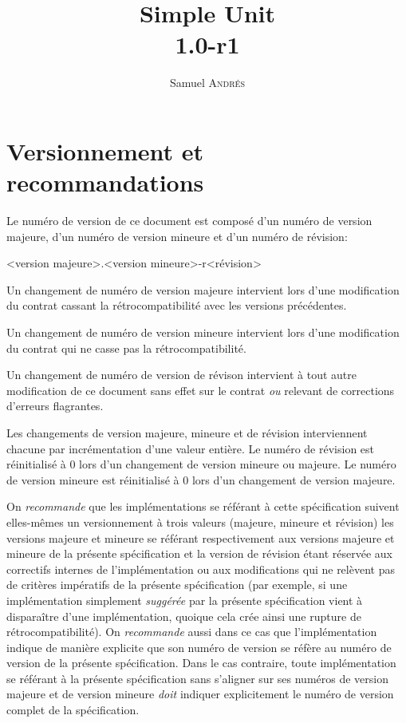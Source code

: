 \documentclass[a4paper,twoside,10pt]{article}
\title{Simple Unit\\1.0-r1}
\author{Samuel \textsc{Andrés}}
\begin{document}
\maketitle

\section{Versionnement et recommandations}

Le numéro de version de ce document est composé d'un numéro de version majeure, d'un numéro de version mineure et d'un
numéro de révision:

<version majeure>.<version mineure>-r<révision>

Un changement de numéro de version majeure intervient lors d'une modification du contrat cassant la rétrocompatibilité
avec les versions précédentes.

Un changement de numéro de version mineure intervient lors d'une modification du contrat qui ne casse pas la
rétrocompatibilité.

Un changement de numéro de version de révison intervient à tout autre modification de ce document sans effet sur le
contrat \emph{ou} relevant de corrections d'erreurs flagrantes.

Les changements de version majeure, mineure et de révision interviennent chacune par incrémentation d'une valeur
entière. Le numéro de révision est réinitialisé à 0 lors d'un changement de version mineure ou majeure. Le numéro de
version mineure est réinitialisé à 0 lors d'un changement de version majeure.

On \emph{recommande} que les implémentations se référant à cette spécification suivent elles-mêmes un versionnement à
trois valeurs (majeure, mineure et révision) les versions majeure et mineure se référant respectivement aux versions
majeure et mineure de la présente spécification et la version de révision étant réservée aux correctifs internes de
l'implémentation ou aux modifications qui ne relèvent pas de critères impératifs de la présente spécification (par
exemple, si une implémentation simplement \emph{suggérée} par la présente spécification vient à disparaître d'une
implémentation, quoique cela crée ainsi une rupture de rétrocompatibilité). On \emph{recommande} aussi dans ce cas que
l'implémentation indique de manière explicite que son numéro de version se réfère au numéro de version de la présente
spécification. Dans le cas contraire, toute implémentation se référant à la présente spécification sans s'aligner sur
ses numéros de version majeure et de version mineure \emph{doit} indiquer explicitement le numéro de version complet de
la spécification.
\end{document}

